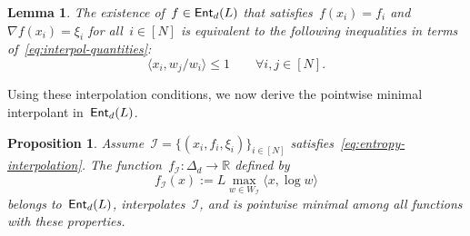 \documentclass[11pt]{article}
\numberwithin{equation}{section}
\let\le\leqslant
\let\ge\geqslant
\newtheorem{proposition}[theorem]{Proposition}
\newtheorem{lemma}[theorem]{Lemma}
\theoremstyle{remark}
\newcommand{\R}{\mathbb{R}}
\newcommand{\ip}[2]{\left\langle #1,#2\right\rangle}
\newcommand{\Ent}{\textup{\textsf{Ent}}}
\newcommand{\Fh}{\Ent_d}
\newcommand{\Simp}{\Delta_d}
\newcommand{\cI}{\mathcal{I}}
\newcommand{\1}{\mathbf{1}}
\newcommand{\bnabla}{\nabla}
\begin{document}
\renewcommand{\ip}[2]{\langle #1, #2 \rangle}

\begin{lemma}
\label{lem:entropy-interpolation}
The existence of~$f \in \Fh(L)$ that satisfies~$f(x_i) = f_i$ and~$\bnabla f(x_i) = \xi_i$ for all~$i \in [N]$ is equivalent to the following inequalities in terms of~\eqref{eq:interpol-quantities}:
\begin{equation}
\label{eq:entropy-interpolation}
 \ip{x_i}{w_j/w_i}\le 1 \qquad \forall i,j \in [N].
\end{equation}
\end{lemma}


Using these interpolation conditions, we now derive the pointwise minimal interpolant in~$\Fh(L)$.

\begin{proposition}%
\label{prop:log-hull}
Assume~$\cI = \{(x_i,f_i,\xi_i)\}_{i \in [N]}$ satisfies~\eqref{eq:entropy-interpolation}.
The function~$f_{\cI}: \Simp \to \R$ defined by
\[
 f_{\cI}(x):=L\max_{w\in W_{\cI}}\ip{x}{\log w}   %
\]
belongs to~$\Fh(L)$, interpolates~$\cI$, 
and is pointwise minimal among all functions with these properties.
\end{proposition}
\end{document}
